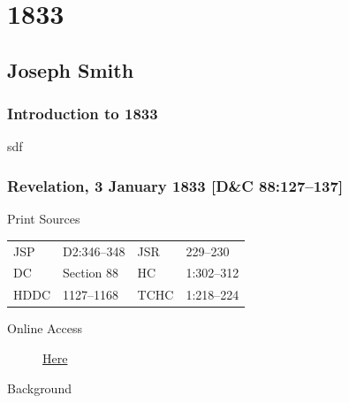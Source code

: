 \section{1833}
	\label{EMS-1833}
	
	\subsection{Joseph Smith}
		\label{EMS-1833-JS}
		
		\subsubsection{Introduction to 1833}
		
			sdf
			
		\subsubsection{Revelation, 3 January 1833 [D\&C 88:127--137]}
			\label{EMS-1833-JS-3-JAN-1833}
		
			\begin{description}
				\item[Print Sources]
			\end{description}

				\begin{tabular}{p{0.5in}p{1in}p{0.5in}p{1in}}
				JSP	 	& D2:346--348		& JSR 		& 229--230 \\
				DC	 	& Section 88 		& HC 		& 1:302--312 \\
				HDDC 	& 1127--1168		& TCHC 		& 1:218--224 \\
				\end{tabular}
			
			\begin{description}
				\item[Online Access] \href{https://www.josephsmithpapers.org/paper-summary/revelation-3-january-1833-dc-88127-137/1}{Here}
			\end{description}
			
			\begin{description}
				\item[Background]
			\end{description}
			

